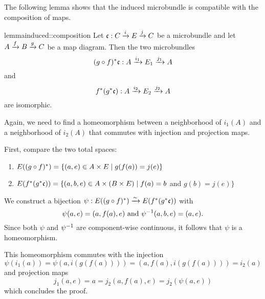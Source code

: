 \begin{myparagraph}
    The following lemma shows that the induced microbundle
    is compatible with the composition of maps.
\end{myparagraph}

\begin{mystatement}{lemma}{induced::composition}
    Let $\bundledef{\bc}{C}{E}{i}{j}$ be a microbundle and let $A \xto{f} B \xto{g} C$ be a map diagram.
    Then the two microbundles
    \[ \bundledef{\ind{(g \circ f)}\bc}{A}{E_1}{i_1}{j_1} \]
    and
    \[ \bundledef{\ind{f}(\ind{g}\bc)}{A}{E_2}{i_2}{j_2} \]
    are isomorphic.
\end{mystatement}

\begin{myproof}
    Again, we need to find a homeomorphism between a neighborhood of $i_1(A)$ and a neighborhood of $i_2(A)$
    that commutes with injection and projection maps.
    
    First, compare the two total spaces:
    \begin{enumerate}
        \item $E(\ind{(g \circ f)}) = \{ (a, e) \in A \cross E \mid g(f(a)) = j(e)\}$ 
        \item $E(\ind{f}(\ind{g}\bc)) = \{ (a, b, e) \in A \cross (B \cross E) \mid f(a) = b$ and $ g(b) = j(e) \}$
    \end{enumerate}
    We construct a bijection $\psi: E(\ind{(g \circ f)}) \isomto E(\ind{f}(\ind{g}\bc))$ with
    \[ \psi(a, e) = (a, f(a), e) \tand \inv{\psi}(a, b, e) = (a, e).\]
    Since both $\psi$ and $\inv{\psi}$ are component-wise continuous, it follows that $\psi$ is a homeomorphism.

    This homeomorphism commutes with the injection
    \[ \psi(i_1(a)) = \psi(a, i(g(f(a)))) = (a, f(a), i(g(f(a)))) = i_2(a) \]
    and projection maps
    \[ j_1(a, e) = a = j_2(a, f(a), e) = j_2(\psi(a, e)) \]
    which concludes the proof.
\end{myproof}